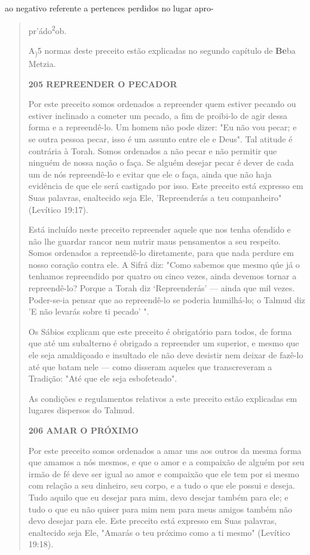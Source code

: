 ao negativo referente a pertences perdidos no lugar apro-

\begin{quote}
pr'ádo\textsuperscript{2}ob.

A\textsubscript{)}5 normas deste preceito estão explicadas no segundo
capítulo de \textbf{Be}ba Metzia.

\textbf{205 REPREENDER O PECADOR}

Por este preceito somos ordenados a repreender quem estiver pe­cando ou
estiver inclinado a cometer um pecado, a fim de proibi-lo de agir des­sa
forma e a repreendê-lo. Um homem não pode dizer: "Eu não vou pecar; e se
outra pessoa pecar, isso é um assunto entre ele e Deus". Tal atitude é
contrá­ria à Torah. Somos ordenados a não pecar e não permitir que
ninguém de nos­sa nação o faça. Se alguém desejar pecar é dever de cada
um de nós repreendê-lo e evitar que ele o faça, ainda que não haja
evidência de que ele será castigado por isso. Este preceito está
expresso em Suas palavras, enaltecido seja Ele, 'Re­preenderás a teu
companheiro" (Levítico 19:17).

Está incluído neste preceito repreender aquele que nos tenha ofen­dido e
não lhe guardar rancor nem nutrir maus pensamentos a seu respeito. Somos
ordenados a repreendê-lo diretamente, para que nada perdure em nos­so
coração contra ele. A Sifrá diz: "Como sabemos que mesmo qúe já o
tenha­mos repreendido por quatro ou cinco vezes, ainda devemos tornar a
repreendê-lo? Porque a Torah diz `Repreenderás' --- ainda que mil vezes.
Poder-se-ia pen­sar que ao repreendê-lo se poderia humilhá-lo; o Talmud
diz 'E não levarás so­bre ti pecado' ".

Os Sábios explicam que este preceito é obrigatório para todos, de forma
que até um subalterno é obrigado a repreender um superior, e mesmo que
ele seja amaldiçoado e insultado ele não deve desistir nem deixar de
fazê-lo até que batam nele --- como disseram aqueles que transcreveram a
Tradição: "Até que ele seja esbofeteado".

As condições e regulamentos relativos a este preceito estão explica­das
em lugares dispersos do Talmud.

\textbf{206 AMAR O PRÓXIMO}

Por este preceito somos ordenados a amar uns aos outros da mesma forma
que amamos a nós mesmos, e que o amor e a compaixão de alguém por seu
irmão de fé deve ser igual ao amor e compaixão que ele tem por si mesmo
com relação a seu dinheiro, seu corpo, e a tudo o que ele possui e
deseja. Tudo aquilo que eu desejar para mim, devo desejar também para
ele; e tudo o que eu não quiser para mim nem para meus amigos também não
devo desejar para ele. Este preceito está expresso em Suas palavras,
enaltecido seja Ele, "Amarás o teu próximo como a ti mesmo" (Levítico
19:18).


\end{quote}
